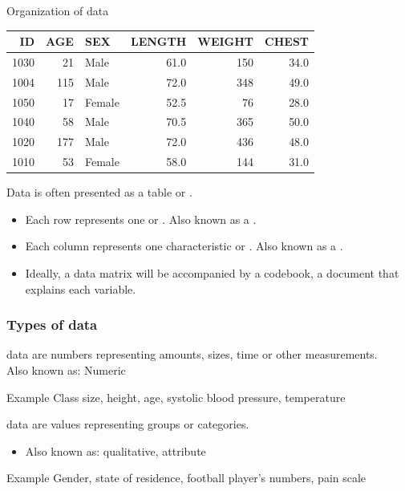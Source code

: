 \documentclass[xcolor=table, aspectratio=169, bigger]{beamer}
\begin{document}
\begin{frame}{Organization of data}

\begin{table}[ht]
\centering
\begin{tabular}{rrlrrr}
  \hline
ID & AGE & SEX & LENGTH & WEIGHT & CHEST \\ 
  \hline
1030 & 21 & Male & 61.0 & 150 & 34.0 \\ 
  1004 & 115 & Male & 72.0 & 348 & 49.0 \\ 
  1050 & 17 & Female & 52.5 & 76 & 28.0 \\ 
  1040 & 58 & Male & 70.5 & 365 & 50.0 \\ 
  1020 & 177 & Male & 72.0 & 436 & 48.0 \\ 
  1010 & 53 & Female & 58.0 & 144 & 31.0 \\ 
   \hline
\end{tabular}
\end{table}

\begin{block}{}
Data is often presented as a table or .
\begin{itemize}
\pause\item Each row represents one  or . Also known as a .
\pause\item Each column represents one characteristic or . Also known as a .
\pause\item Ideally, a data matrix will be accompanied by a codebook, a document that explains each variable.
\end{itemize}
\end{block}

\end{frame}


\begin{frame}
\frametitle{Types of data}

\begin{block}{}
 data are numbers representing amounts, sizes, time or other measurements.\\
Also known as: Numeric
\end{block}

\begin{exampleblock}{Example}
Class size, height, age, systolic blood pressure, temperature
\end{exampleblock}

\pause

\begin{block}{}
 data are values representing groups or categories.
\begin{itemize}
\item Also known as: qualitative, attribute
\end{itemize}
\end{block}

\begin{exampleblock}{Example}
Gender, state of residence, football player's numbers, pain scale
\end{exampleblock}

\end{frame}
\end{document}
